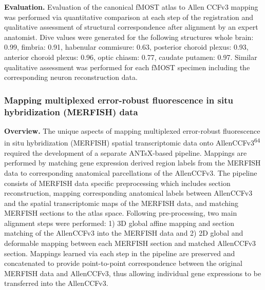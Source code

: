 \documentclass[
  12pt,
]{article}
\begin{document}
\textbf{Evaluation.} Evaluation of the canonical fMOST atlas to Allen
CCFv3 mapping was performed via quantitative comparison at each step of
the registration and qualitative assessment of structural correspondence
after alignment by an expert anatomist. Dive values were generated for
the following structures whole brain: 0.99, fimbria: 0.91, habenular
commisure: 0.63, posterior choroid plexus: 0.93, anterior choroid
plexus: 0.96, optic chiasm: 0.77, caudate putamen: 0.97. Similar
qualitative assessment was performed for each fMOST specimen including
the corresponding neuron reconstruction data.

\hypertarget{mapping-multiplexed-error-robust-fluorescence-in-situ-hybridization-merfish-data}{%
\subsubsection{Mapping multiplexed error-robust fluorescence in situ
hybridization (MERFISH)
data}\label{mapping-multiplexed-error-robust-fluorescence-in-situ-hybridization-merfish-data}}

\textbf{Overview.} The unique aspects of mapping multiplexed
error-robust fluorescence in situ hybridization (MERFISH) spatial
transcriptomic data onto AllenCCFv3\textsuperscript{64} required the
development of a separate ANTsX-based pipeline. Mappings are performed
by matching gene expression derived region labels from the MERFISH data
to corresponding anatomical parcellations of the AllenCCFv3. The
pipeline consists of MERFISH data specific preprocessing which includes
section reconstruction, mapping corresponding anatomical labels between
AllenCCFv3 and the spatial transcriptomic maps of the MERFISH data, and
matching MERFISH sections to the atlas space. Following pre-processing,
two main alignment steps were performed: 1) 3D global affine mapping and
section matching of the AllenCCFv3 into the MERFISH data and 2) 2D
global and deformable mapping between each MERFISH section and matched
AllenCCFv3 section. Mappings learned via each step in the pipeline are
preserved and concatenated to provide point-to-point correspondence
between the original MERFISH data and AllenCCFv3, thus allowing
individual gene expressions to be transferred into the AllenCCFv3.
\end{document}
